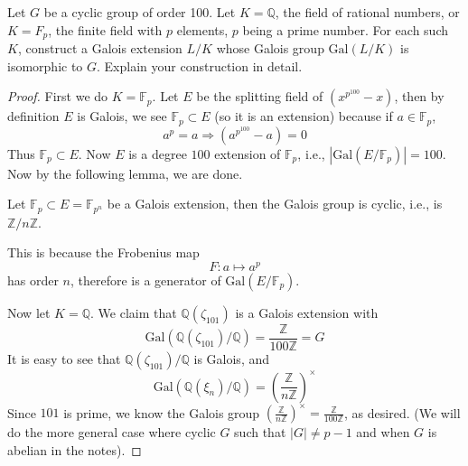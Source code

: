 \documentclass[openany]{book}
\newcommand{\Z}{\mathbb{Z}}
\newcommand{\F}{\mathbb{F}}
\newcommand{\Q}{\mathbb{Q}}
\newcommand{\gal}{\text{Gal}}
\begin{document}
\begin{prob}
    Let \(G\) be a cyclic group of order 100. Let \(K=\mathbb{Q}\), the field of rational numbers, or \(K=F_p\), the finite field with \(p\) elements, \(p\) being a prime number. For each such \(K\), construct a Galois extension \(L/K\) whose Galois group \(\text{Gal}(L/K)\) is isomorphic to \(G\). Explain your construction in detail.
\end{prob}
\begin{proof}
    First we do $K=\F_p$. Let $E$ be the splitting field of $(x^{p^{100}}-x)$, then by definition $E$ is Galois, we see $\F_p\subset E$ (so it is an extension) because if $a\in\F_p$,
    \begin{equation*}
        a^p=a\Rightarrow (a^{p^{100}}-a)=0
    \end{equation*}
    Thus $\F_p\subset E$. Now $E$ is a degree $100$ extension of $\F_p$, i.e., $\left|\gal(E/\F_p)\right|=100$. Now by the following lemma, we are done.
    \begin{lem}
        Let $\F_p\subset E=\F_{p^n}$ be a Galois extension, then the Galois group is cyclic, i.e., is $\Z/n\Z$.
    \end{lem}
    This is because the Frobenius map 
    \begin{equation*}
        F: a\mapsto a^{p}
    \end{equation*}
    has order $n$, therefore is a generator of $\gal(E/\F_p)$. 

    Now let $K=\Q$. We claim that $\Q(\zeta_{101})$ is a Galois extension with 
    \begin{equation*}
        \gal(\Q(\zeta_{101})/\Q)=\frac{\Z}{100\Z}=G
    \end{equation*}
    It is easy to see that $\Q(\zeta_{101})/\Q$ is Galois, and 
    \begin{equation*}
        \gal(\Q(\xi_n)/\Q)=\left(\frac{\Z}{n\Z}\right)^\times
    \end{equation*}
    Since $101$ is prime, we know the Galois group $\left(\frac{\Z}{n\Z}\right)^\times=\frac{\Z}{100\Z}$, as desired. (We will do the more general case where cyclic $G$ such that $|G|\neq p-1$ and when $G$ is abelian in the notes).
\end{proof}
\end{document}
